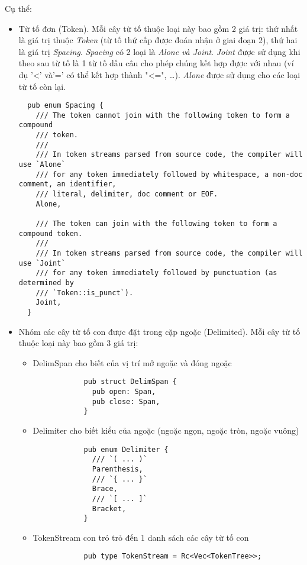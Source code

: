 Cụ thể:
\begin{itemize}
  \item Từ tố đơn (Token). Mỗi cây từ tố thuộc loại này bao gồm 2 giá trị: thứ nhất là giá trị thuộc \textit{Token} (từ tố thứ cấp được đoán nhận ở giai đoạn 2), thứ hai là giá trị \textit{Spacing}. \textit{Spacing} có 2 loại là \textit{Alone \emph{và} Joint}. \textit{Joint} được sử dụng khi theo sau từ tố là 1 từ tố dấu câu cho phép chúng kết hợp đựợc với nhau (ví dụ '<' và'=' có thể kết hợp thành "<=", \dots). \textit{Alone} được sử dụng cho các loại từ tố còn lại. 
  \begin{lstlisting}
  pub enum Spacing {
    /// The token cannot join with the following token to form a compound
    /// token.
    ///
    /// In token streams parsed from source code, the compiler will use `Alone`
    /// for any token immediately followed by whitespace, a non-doc comment, an identifier,
    /// literal, delimiter, doc comment or EOF.
    Alone,

    /// The token can join with the following token to form a compound token.
    ///
    /// In token streams parsed from source code, the compiler will use `Joint`
    /// for any token immediately followed by punctuation (as determined by
    /// `Token::is_punct`).
    Joint,
  }
  \end{lstlisting}
  \item Nhóm các cây từ tố con được đặt trong cặp ngoặc (Delimited). Mỗi cây từ tố thuộc loại này bao gồm 3 giá trị:
  \begin{itemize}
    \item DelimSpan cho biết của vị trí mở ngoặc và đóng ngoặc
          \begin{lstlisting}
            pub struct DelimSpan {
              pub open: Span,
              pub close: Span,
            }
          \end{lstlisting}
    \item Delimiter cho biết kiểu của ngoặc (ngoặc ngọn, ngoặc tròn, ngoặc vuông)
          \begin{lstlisting}
            pub enum Delimiter {
              /// `( ... )`
              Parenthesis,
              /// `{ ... }`
              Brace,
              /// `[ ... ]`
              Bracket,
            }
          \end{lstlisting}
    \item TokenStream con trỏ trỏ đến 1 danh sách các cây từ tố con
          \begin{lstlisting}
            pub type TokenStream = Rc<Vec<TokenTree>>;
          \end{lstlisting}
  \end{itemize}
\end{itemize}

